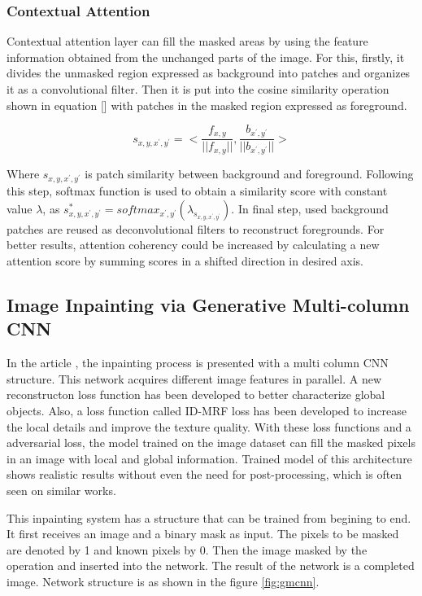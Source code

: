 \newpage
\subsubsection{Contextual Attention}

Contextual attention layer can fill the masked areas by using the feature information obtained from the unchanged parts of the image. For this, firstly, it divides the unmasked region expressed as background into patches and organizes it as a convolutional filter. Then it is put into the cosine similarity operation shown in equation [] with patches in the masked region expressed as foreground.

\begin{equation}
\label{eqn:context}
    s_{x,y,x^{'},y^{'}} = <\frac{f_{x,y}}{||f_{x,y}||}, \frac{b_{x^',y^'}}{||b_{x^{'},y^{'}}||}>
\end{equation}

Where \(s_{x,y,x^{'},y^{'}}\) is patch similarity between background and foreground. Following this step, softmax function is used to obtain a similarity score with constant value \(\lambda\), as \(s^{*}_{x,y,x^{'},y^{'}} = softmax_{x^{'},y^{'} } ( \lambda_{s_{x,y,x^{'},y^{'} } } )\). In final step, used background patches are reused as deconvolutional filters to reconstruct foregrounds. For better results, attention coherency could be increased by calculating a new attention score by summing scores in a shifted direction in desired axis.

\subsection{Image Inpainting via Generative Multi-column CNN}

In the article \cite{inpainting_via_multi_cnn}, the inpainting process is presented with a multi column CNN structure. This network acquires different image features in parallel. A new reconstructon loss function has been developed to better characterize global objects. Also, a loss function called ID-MRF loss has been developed to increase the local details and improve the texture quality. With these loss functions and a adversarial loss, the model trained on the image dataset can fill the masked pixels in an image with local and global information. Trained model of this architecture shows realistic results without even the need for post-processing, which is often seen on similar works.

This inpainting system has a structure that can be trained from begining to end. It first receives an image and a binary mask as input. The pixels to be masked are denoted by 1 and known pixels by 0. Then the image masked by the  operation and inserted into the network. The result of the network is a completed image. Network structure is as shown in the figure \ref{fig:gmcnn}.

